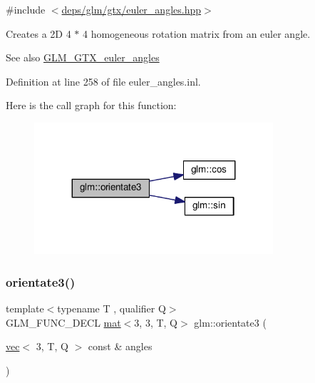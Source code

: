 {\ttfamily \#include $<$\hyperlink{euler__angles_8hpp}{deps/glm/gtx/euler\+\_\+angles.\+hpp}$>$}

Creates a 2D 4 $\ast$ 4 homogeneous rotation matrix from an euler angle. \begin{DoxySeeAlso}{See also}
\hyperlink{group__gtx__euler__angles}{G\+L\+M\+\_\+\+G\+T\+X\+\_\+euler\+\_\+angles} 
\end{DoxySeeAlso}


Definition at line 258 of file euler\+\_\+angles.\+inl.

Here is the call graph for this function\+:
\nopagebreak
\begin{figure}[H]
\begin{center}
\leavevmode
\includegraphics[width=251pt]{d2/d7e/group__gtx__euler__angles_ga7ca98668a5786f19c7b38299ebbc9b4c_cgraph}
\end{center}
\end{figure}
\mbox{\label{group__gtx__euler__angles_ga7238c8e15c7720e3ca6a45ab151eeabb}} 
\subsubsection{\texorpdfstring{orientate3()}{orientate3()}\hspace{0.1cm}{\footnotesize\ttfamily [2/2]}}
{\footnotesize\ttfamily template$<$typename T , qualifier Q$>$ \\
G\+L\+M\+\_\+\+F\+U\+N\+C\+\_\+\+D\+E\+CL \hyperlink{structglm_1_1mat}{mat}$<$3, 3, T, Q$>$ glm\+::orientate3 (\begin{DoxyParamCaption}\item[{\hyperlink{structglm_1_1vec}{vec}$<$ 3, T, Q $>$ const \&}]{angles }\end{DoxyParamCaption})}



